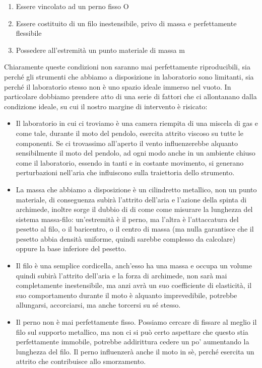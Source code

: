 \documentclass{article}
\begin{document}
\begin{enumerate}
    \item Essere vincolato ad un perno fisso O
    \item Essere costituito di un filo inestensibile, privo di massa e perfettamente flessibile
    \item Possedere all’estremità un punto materiale di massa m
\end{enumerate}
Chiaramente queste condizioni non saranno mai perfettamente riproducibili, sia perché gli strumenti che abbiamo a disposizione in laboratorio sono limitanti, sia perché il laboratorio stesso non è uno spazio ideale immerso nel vuoto. In particolare dobbiamo prendere atto di una serie di fattori che ci allontanano dalla condizione ideale, su cui il nostro margine di intervento è risicato:
\begin{itemize}
    \item Il laboratorio in cui ci troviamo è una camera riempita di una miscela di gas e come tale, durante il moto del pendolo, esercita attrito viscoso su tutte le componenti. Se ci trovassimo all’aperto il vento influenzerebbe alquanto sensibilmente il moto del pendolo, ad ogni modo anche in un ambiente chiuso come il laboratorio, essendo in tanti e in costante movimento, si generano perturbazioni nell’aria che influiscono sulla traiettoria dello strumento.
    \item La massa che abbiamo a disposizione è un cilindretto metallico, non un punto materiale, di conseguenza subirà l’attrito dell’aria e l’azione della spinta di archimede, inoltre sorge il dubbio di di come come misurare la lunghezza del sistema massa-filo: un’estremità è il perno, ma l’altra è l’attaccatura del pesetto al filo, o il baricentro, o il centro di massa (ma nulla garantisce che il pesetto abbia densità uniforme, quindi sarebbe complesso da calcolare) oppure la base inferiore del pesetto.
    \item Il filo è una semplice cordicella, anch’esso ha una massa e occupa un volume quindi subirà l’attrito dell’aria e la forza di archimede, non sarà mai completamente inestensibile, ma anzi avrà un suo coefficiente di elasticità, il suo comportamento durante il moto è alquanto imprevedibile, potrebbe allungarsi, accorciarsi, ma anche torcersi su sé stesso.
    \item Il perno non è mai perfettamente fisso. Possiamo cercare di fissare al meglio il filo sul supporto metallico, ma non ci si può certo aspettare che questo stia perfettamente immobile, potrebbe addirittura cedere un po’ aumentando la lunghezza del filo. Il perno influenzerà anche il moto in sè, perché esercita un attrito che contribuisce allo smorzamento.
\end{itemize}
\end{document}
